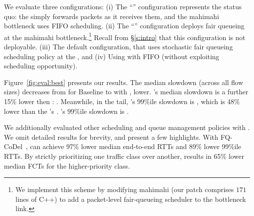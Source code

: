 We evaluate three configurations: 
(i) The ``\baseline'' configuration represents the status quo: the \inbox simply forwards packets as it receives them, and the mahimahi bottleneck uses FIFO scheduling.
(ii) The ``\optimal'' configuration deploys fair queueing
at the mahimahi bottleneck.\footnote{
We implement this scheme by modifying mahimahi (our patch comprises $171$ lines of C++) to add a packet-level fair-queueing scheduler to the bottleneck link.}
Recall from \S\ref{s:intro} that this configuration is not deployable.
(iii) The default \name configuration, that uses stochastic fair queueing~\cite{sfq} scheduling policy at the \inbox, and (iv) Using \name with FIFO (without exploiting scheduling opportunity).

Figure~\ref{fig:eval:best} presents our results. 
The median slowdown (across all flow sizes) decreases from \overviewBenefitsBaselineMedian 
for Baseline to \overviewBenefitsBundlerMedian 
with \name, \overviewBenefitsBundlerMedianImprovement
lower. 
\optimal's median slowdown is a further 15\% lower then \name: \overviewBenefitsOptimalMedian.
Meanwhile, in the tail, \name's $99\%$ile slowdown is \overviewBenefitsBundlerTail, which is 48\% lower than the \baseline's \overviewBenefitsBaselineTail. \optimal's $99\%$ile slowdown is \overviewBenefitsOptimalTail.

 We additionally evaluated other scheduling and queue management policies with \name. We omit detailed results for brevity, and present a few highlights. With FQ-CoDel~\cite{fq-codel}, \name can achieve 97\% lower median end-to-end RTTs and 89\% lower 99\%ile RTTs.  By strictly prioritizing one traffic class over another, \name results in 65\% lower median FCTs for the higher-priority class. 

